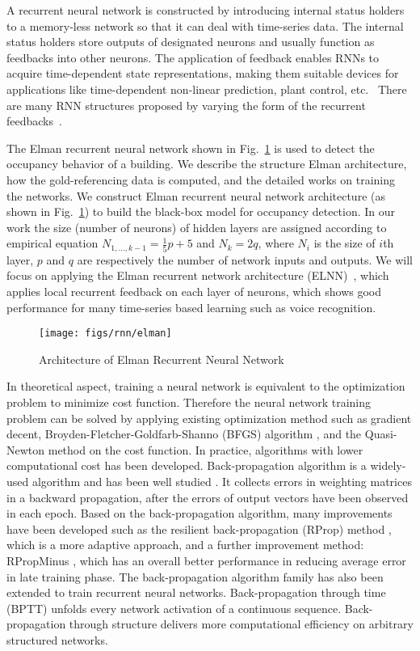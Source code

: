 A recurrent neural network is constructed by introducing
internal status holders to a memory-less network so that it can deal
with time-series data. The internal status holders store outputs of
designated neurons and usually function as feedbacks into other
neurons. The application of feedback enables RNNs to acquire
time-dependent state representations, making them suitable devices for
applications like time-dependent non-linear prediction, plant control,
etc.~\cite{haykin2004compreh} There are many RNN structures
proposed by varying the form of the recurrent
feedbacks~\cite{elman1990finding,haykin2004compreh,puskorius1996dynamic}.

\textcolor{feb18rev}{The Elman recurrent neural network shown in
Fig.~\ref{fig:elman} is used to detect the occupancy behavior of a building.}
We describe the structure Elman architecture, how the gold-referencing data is
computed, and the detailed works on training the networks. We construct Elman recurrent neural network architecture (as shown in Fig.~\ref{fig:elman}) to build the black-box model for occupancy detection. In
our work the size (number of neurons) of hidden layers are assigned according
to empirical equation $N_{1,\ldots,k-1}=\frac15p+5$ and $N_k=2q$, where $N_i$
is the size of $i$th layer, $p$ and $q$ are respectively the number of network
inputs and outputs. We will focus on applying the Elman recurrent network
architecture (ELNN)~\cite{elman1990finding}, which applies local
recurrent feedback on each layer of neurons, which shows good
performance for many time-series based learning such as voice
recognition.

\begin{figure}[t]
    \centering
    \texttt{[image: figs/rnn/elman]}
    \caption{Architecture of Elman Recurrent Neural Network}
    \label{fig:elman}
\end{figure}


In theoretical aspect, training a neural network is equivalent to the optimization problem to minimize cost function. Therefore the neural network training problem can be solved by applying existing optimization method such as gradient decent, Broyden-Fletcher-Goldfarb-Shanno (BFGS) algorithm
\cite{heath2010sci}, and the Quasi-Newton method on the cost function. In
practice, algorithms with lower computational cost has been developed.
Back-propagation algorithm is a widely-used algorithm and has been well studied
\cite{hecht1988backprop}. It collects errors in weighting matrices in a
backward propagation, after the errors of output vectors have been observed in
each epoch. Based on the back-propagation algorithm, many improvements have
been developed such as the resilient back-propagation (RProp) method
\cite{riedmiller1993direct}, which is a more adaptive approach, and a further
improvement method: RPropMinus \cite{igel2003empirical}, which has an overall
better performance in reducing average error in late training phase. The
back-propagation algorithm family has also been extended to train recurrent
neural networks. Back-propagation through time (BPTT) \cite{werbos1990backprop}
unfolds every network activation of a continuous sequence. Back-propagation
through structure delivers more computational efficiency on arbitrary
structured networks.
